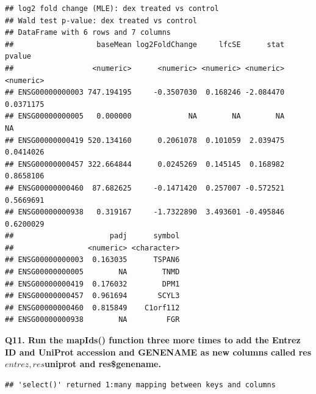 \documentclass[
]{article}
\newenvironment{Shaded}{\begin{snugshade}}{\end{snugshade}}
\newcommand{\AttributeTok}[1]{\textcolor[rgb]{0.77,0.63,0.00}{#1}}
\newcommand{\FunctionTok}[1]{\textcolor[rgb]{0.00,0.00,0.00}{#1}}
\newcommand{\NormalTok}[1]{#1}
\newcommand{\OtherTok}[1]{\textcolor[rgb]{0.56,0.35,0.01}{#1}}
\newcommand{\SpecialCharTok}[1]{\textcolor[rgb]{0.00,0.00,0.00}{#1}}
\newcommand{\StringTok}[1]{\textcolor[rgb]{0.31,0.60,0.02}{#1}}
\begin{document}
\begin{verbatim}
## log2 fold change (MLE): dex treated vs control 
## Wald test p-value: dex treated vs control 
## DataFrame with 6 rows and 7 columns
##                   baseMean log2FoldChange     lfcSE      stat    pvalue
##                  <numeric>      <numeric> <numeric> <numeric> <numeric>
## ENSG00000000003 747.194195     -0.3507030  0.168246 -2.084470 0.0371175
## ENSG00000000005   0.000000             NA        NA        NA        NA
## ENSG00000000419 520.134160      0.2061078  0.101059  2.039475 0.0414026
## ENSG00000000457 322.664844      0.0245269  0.145145  0.168982 0.8658106
## ENSG00000000460  87.682625     -0.1471420  0.257007 -0.572521 0.5669691
## ENSG00000000938   0.319167     -1.7322890  3.493601 -0.495846 0.6200029
##                      padj      symbol
##                 <numeric> <character>
## ENSG00000000003  0.163035      TSPAN6
## ENSG00000000005        NA        TNMD
## ENSG00000000419  0.176032        DPM1
## ENSG00000000457  0.961694       SCYL3
## ENSG00000000460  0.815849    C1orf112
## ENSG00000000938        NA         FGR
\end{verbatim}

\textbf{Q11. Run the mapIds() function three more times to add the
Entrez ID and UniProt accession and GENENAME as new columns called
res\(entrez, res\)uniprot and res\$genename.}

\begin{Shaded}
\end{Shaded}

\begin{verbatim}
## 'select()' returned 1:many mapping between keys and columns
\end{verbatim}

\begin{Shaded}
\end{Shaded}
\end{document}
